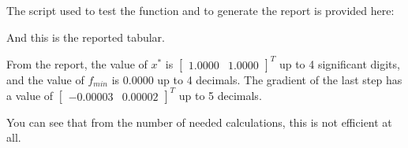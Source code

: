 \documentclass{article}
\begin{document}
The script used to test the function and to generate the report is provided here:



And this is the reported tabular.



From the report, the value of $x^*$ is $\begin{bmatrix}
    1.0000 & 1.0000
\end{bmatrix}^T$ up to 4 significant digits, and the value of $f_{min}$ is $0.0000$ up to 4 decimals. The gradient of the last step has a value of $\begin{bmatrix}
 -0.00003 & 0.00002
\end{bmatrix}^T$ up to 5 decimals. 

You can see that from the number of needed calculations, this is not efficient at all.
\end{document}
